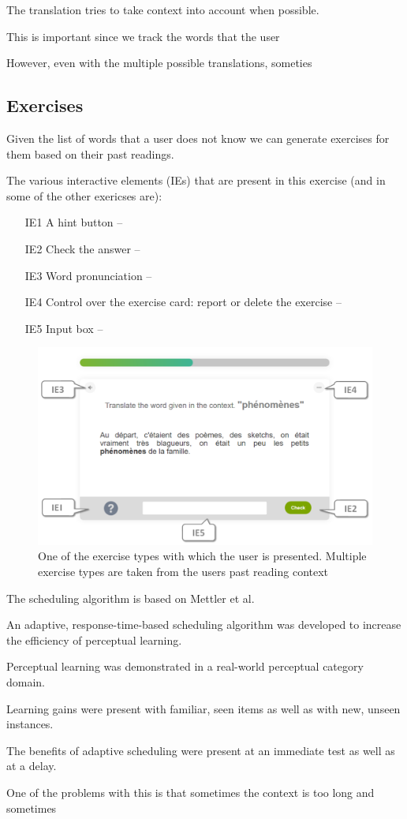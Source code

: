 The translation tries to take context into account when possible. 


This is important since we track the words that the user 


However, even with the multiple possible translations, someties 


\subsection {Exercises}

Given the list of words that a user does not know we can generate exercises for them based on their past readings.

The various interactive elements (IEs) that are present in this exercise (and in some of the other exericses are): 

\begin{itemize}
	\item [IE1] A hint button --
	\item [IE2] Check the answer -- 
	\item [IE3] Word pronunciation -- 
	\item [IE4] Control over the exercise card: report or delete the exercise -- 
	\item [IE5] Input box -- 
\end{itemize}

\begin{figure}[h!]
\centering
  \includegraphics[width=\columnwidth]{figures/exercise_translate}
  \caption{One of the exercise types with which the user is presented. Multiple exercise types are taken from the users past reading context}
\end{figure}

The scheduling algorithm is based on Mettler et al. \cite{Mettler14-ARTS}

An adaptive, response-time-based scheduling algorithm was developed to increase the efficiency of perceptual learning.

Perceptual learning was demonstrated in a real-world perceptual category domain.

Learning gains were present with familiar, seen items as well as with new, unseen instances.

The benefits of adaptive scheduling were present at an immediate test as well as at a delay.



One of the problems with this is that sometimes the context is too long and sometimes 

